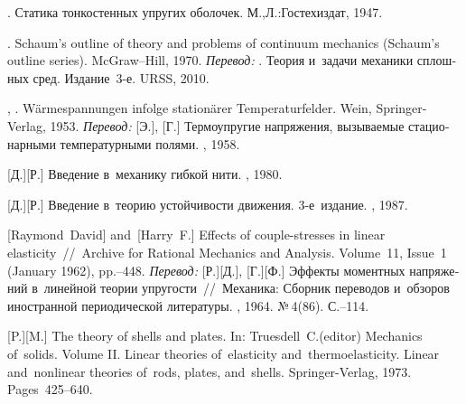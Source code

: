\begin{thebibliography}{123}
\begin{otherlanguage}{russian}
.
Статика тонкостенных упругих оболочек.
М.,\:Л.:\;Гос\-тех\-издат, 1947.

.
Schaum’s outline of theory and problems of continuum mechanics
(Schaum’s outline series).
McGraw\hbox{--}Hill,
1970.
\emph{Перевод:}
.
Теория и~задачи механики сплошных сред.
Издание~3\hbox{-}е.
URSS, 2010.


, . Wärmespannungen infolge stationärer Temperaturfelder. Wein, Springer-Verlag, 1953. 
\emph{Перевод:} [Э.], [Г.] Термоупругие напряжения, вызываемые стационарными температурными полями. \fizmatgiz, 1958. 

[Д.][Р.] Введение в~механику гибкой нити. \naukapublisher, 1980. 

[Д.][Р.] Введение в~теорию устойчивости движения. 3\hbox{-}е~издание. \naukapublisher, 1987. 

[Raymond~David] %
and~[Harry~F.] %
Effects of couple-stresses in linear elasticity~//~Archive for Rational Mechanics and Analysis. Volume~11, Issue~1 (January 1962), pp.\hbox{--}448.
\emph{Перевод:}
[Р.][Д.], [Г.][Ф.]
Эффекты моментных напряжений в~линейной теории упругости~//~Механика: Сборник переводов и~обзоров иностранной периодической литературы. \mirpublisher, 1964. №\,4\:(86). С.\hbox{--}114.

[P.][M.] The theory of shells and plates. In: Truesdell~C.\:(editor) Mechanics of~solids. Volume II. Linear theories of~elasticity and~thermoelasticity. Linear and~nonlinear theories of~rods, plates, and~shells. Springer\hbox{-}Verlag, 1973. Pages~425\hbox{--}640.


\end{otherlanguage}
\end{thebibliography}
